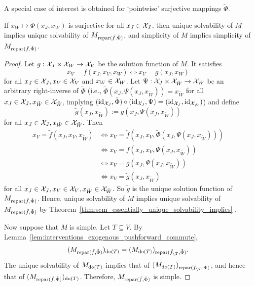 A special case of interest is obtained for `pointwise' surjective mappings $\tilde{\Phi}$.
\begin{Cor}
  If $x_W \mapsto \tilde{\Phi}(x_J,x_W)$ is surjective for all $x_J \in \mathcal{X}_J$, then unique solvability of $M$ implies unique solvability of $M_{\mathrm{repar}({\tilde{f}},{\tilde{\Phi}})}$,
  and simplicity of $M$ implies simplicity of $M_{\mathrm{repar}({\tilde{f}},{\tilde{\Phi}})}$.
\end{Cor}
\begin{proof}
  Let $g : \mathcal{X}_J \times \mathcal{X}_W \to \mathcal{X}_V$ be the solution function of $M$. 
  It satisfies
  $$x_V = f(x_J,x_V,x_W) \iff x_V = g(x_J,x_W)$$
  for all $x_J \in \mathcal{X}_J, x_V \in \mathcal{X}_V$ and $x_W \in \mathcal{X}_W$.
  Let $\Psi : \mathcal{X}_J \times \mathcal{X}_{\tilde{W}} \to \mathcal{X}_W$ be an arbitrary  right-inverse of $\tilde{\Phi}$ (i.e., 
  $\tilde{\Phi}(x_J,\Psi(x_J,x_{\tilde{W}})) = x_{\tilde{W}}$ for all $x_J \in \mathcal{X}_J, x_{\tilde{W}} \in \mathcal{X}_{\tilde{W}}$,
  implying
  $(\mathrm{id}_{\mathcal{X}_J},\tilde{\Phi}) \circ (\mathrm{id}_{\mathcal{X}_J},\Psi) = (\mathrm{id}_{\mathcal{X}_J},\mathrm{id}_{\mathcal{X}_{\tilde{W}}})$)
  and define 
  $$\tilde{g}(x_J,x_{\tilde{W}}) := g(x_J,\Psi(x_J,x_{\tilde{W}}))$$
  for all $x_J \in \mathcal{X}_J, x_{\tilde{W}} \in \mathcal{X}_{\tilde{W}}$. 
  Then
  \begin{equation*}\begin{split}
    x_V = \tilde{f}(x_J,x_V,x_{\tilde{W}}) 
    &\iff x_V = \tilde{f}(x_J,x_V,\tilde{\Phi}(x_J,\Psi(x_J,x_{\tilde{W}}))) \\
    &\iff x_V = f(x_J,x_V,\Psi(x_J,x_{\tilde{W}})) \\
    &\iff x_V = g(x_J,\Psi(x_J,x_{\tilde{W}})) \\
    &\iff x_V = \tilde{g}(x_J,x_{\tilde{W}})
  \end{split}\end{equation*}
  for all $x_J \in \mathcal{X}_J, x_V \in \mathcal{X}_V, x_{\tilde{W}} \in \mathcal{X}_{\tilde{W}}$.
  So $\tilde{g}$ is the unique solution function of $M_{\mathrm{repar}({\tilde{f}},{\tilde{\Phi}})}$.
  Hence, unique solvability of $M$ implies unique solvability of $M_{\mathrm{repar}({\tilde{f}},{\tilde{\Phi}})}$ by Theorem~\ref{thm:scm_essentially_unique_solvability_implies} .

  Now suppose that $M$ is simple. Let $T \subseteq V$. By Lemma~\ref{lem:interventions_exogenous_pushforward_commute}, 
  $$(M_{\mathrm{repar}({\tilde{f}},{\tilde{\Phi}})})_{\operatorname{do}(T)} = (M_{\operatorname{do}(T)})_{\mathrm{repar}({\tilde{f}_{\setminus T}},{\tilde{\Phi}})}.$$
  The unique solvability of $M_{\operatorname{do}(T)}$ implies that of $(M_{\operatorname{do}(T)})_{\mathrm{repar}({\tilde{f}_{\setminus T}},{\tilde{\Phi}})}$,
  and hence that of $(M_{\mathrm{repar}({\tilde{f}},{\tilde{\Phi}})})_{\operatorname{do}(T)}$.
  Therefore, $M_{\mathrm{repar}({\tilde{f}},{\tilde{\Phi}})}$ is simple.
\end{proof}


